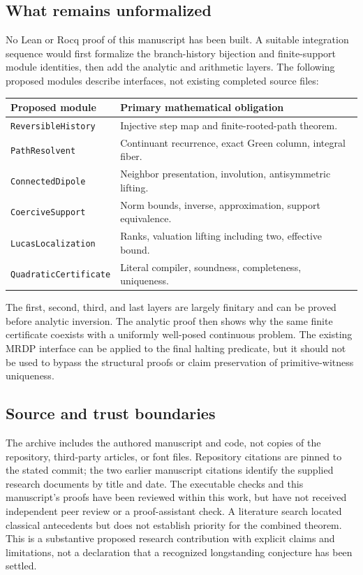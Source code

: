 \documentclass[11pt,letterpaper]{article}
\theoremstyle{definition}
\theoremstyle{remark}
\begin{document}
\subsection{What remains unformalized}
No Lean or Rocq proof of this manuscript has been built. A suitable integration
sequence would first formalize the branch-history bijection and
finite-support module identities, then add the analytic and arithmetic
layers. The following proposed modules describe interfaces, not existing
completed source files:
\begin{center}
\begin{tabularx}{\linewidth}{@{}lX@{}}
\toprule
Proposed module&Primary mathematical obligation\\
\midrule
\texttt{ReversibleHistory}&Injective step map and finite-rooted-path theorem.\\
\texttt{PathResolvent}&Continuant recurrence, exact Green column, integral fiber.\\
\texttt{ConnectedDipole}&Neighbor presentation, involution, antisymmetric lifting.\\
\texttt{CoerciveSupport}&Norm bounds, inverse, approximation, support equivalence.\\
\texttt{LucasLocalization}&Ranks, valuation lifting including two, effective bound.\\
\texttt{QuadraticCertificate}&Literal compiler, soundness, completeness, uniqueness.\\
\bottomrule
\end{tabularx}
\end{center}
The first, second, third, and last layers are largely finitary and can be
proved before analytic inversion. The analytic proof then shows why the
same finite certificate coexists with a uniformly well-posed continuous
problem. The existing MRDP interface can be applied to the final halting
predicate, but it should not be used to bypass the structural proofs or
claim preservation of primitive-witness uniqueness.

\subsection{Source and trust boundaries}
The archive includes the authored manuscript and code, not copies of the
repository, third-party articles, or font files. Repository citations are
pinned to the stated commit; the two earlier manuscript citations identify
the supplied research documents by title and date. The executable checks
and this manuscript's proofs have been reviewed within this work, but
have not received independent peer review or a proof-assistant check.
A literature search located classical antecedents but does not establish
priority for the combined theorem. This is a substantive proposed research
contribution with explicit claims and limitations, not a declaration that
a recognized longstanding conjecture has been settled.
\end{document}
